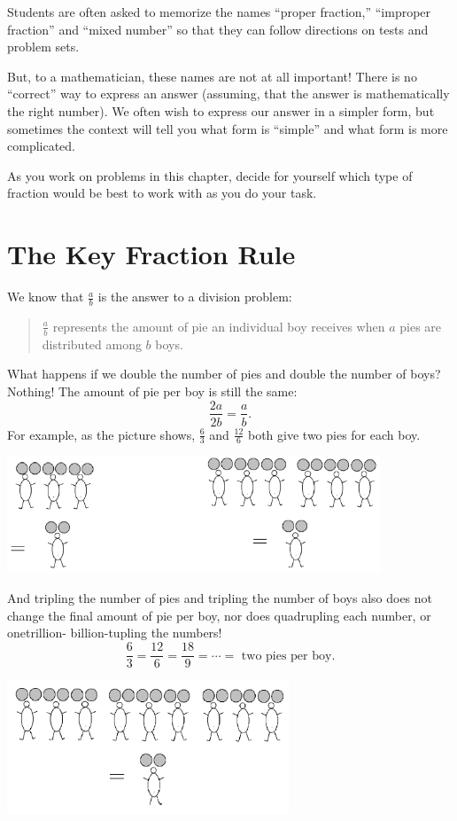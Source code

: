 Students are often asked to memorize the names ``proper fraction,''
``improper fraction'' and ``mixed number'' so that they can follow directions on tests
and problem sets.

But, to a mathematician, these names are not at all important!
There is no ``correct'' way to express an answer (assuming, that the answer is
mathematically the right number).  We often wish to express our answer in a simpler form, but sometimes the context will tell you what form is ``simple'' and what form is more complicated.

As you work on problems in this chapter, decide for yourself  which type of fraction would
be best to work with as you do your task.



\section{The Key Fraction Rule}
We know that $\frac a b$
is the answer to a division problem:
\begin{quotation}
$\displaystyle\frac a b $
represents the amount of pie an individual boy receives when $a$ pies are
distributed among $b$ boys.
\end{quotation}
What happens if we double the number of pies and double the number of boys?
Nothing! The amount of pie per boy is still the same:
\[
\frac{2a}{2b} = \frac a b.
\]
For example, as the picture shows,
$\frac 6 3$ and
$\frac{12} 6$
both give two pies for each boy.
 
   \begin{center}
\includegraphics[height = 3.5cm]{PPBreduce}
\end{center}

And tripling the number of pies and tripling the number of boys also does not
change the final amount of pie per boy, nor does quadrupling each number, or onetrillion-
billion-tupling the numbers!
\[
\frac 6 3
= 
\frac{12} 6 = 
\frac {18}9 =
\cdots =
\text{ two pies per boy}.
\]

   \begin{center}
\includegraphics[height = 4cm]{PPBreduce2}
\end{center}


